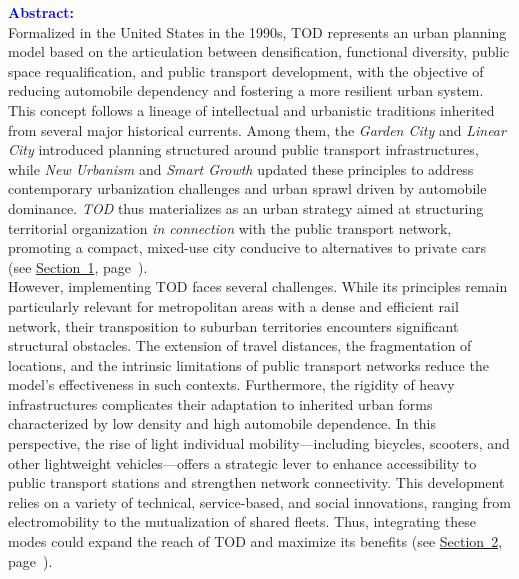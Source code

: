 \begin{refsegment}
    \newpage
    \begin{tcolorbox}[colback=white!5!white,
                      colframe=blue!75!blue,
                      title=
                      \bigskip
                      \center{\textbf{Preamble of Chapter~1}}
                      \\
                      \raggedright{\small{Chapter composed of \pagedifference{chap1:titre}{chap2:titre} pages, including \pagedifference{chap1:bibliographie}{chap2:titre} pages of bibliography}}
                      \bigskip]
\Large{\textbf{\textcolor{blue}{Abstract:}}}
    \\
    \small{
Formalized in the United States in the 1990s, \acrshort{TOD} represents an urban planning model based on the articulation between densification, functional diversity, public space requalification, and public transport development, with the objective of reducing automobile dependency and fostering a more resilient urban system. This concept follows a lineage of intellectual and urbanistic traditions inherited from several major historical currents. Among them, the \textsl{Garden City} and \textsl{Linear City} introduced planning structured around public transport infrastructures, while \textsl{New Urbanism} and \textsl{Smart Growth} updated these principles to address contemporary urbanization challenges and urban sprawl driven by automobile dominance. \textsl{TOD} thus materializes as an urban strategy aimed at structuring territorial organization \textsl{in connection} with the public transport network, promoting a compact, mixed-use city conducive to alternatives to private cars (see \hyperref[chap1:tod-presentation-generale]{Section~1}, page~\pageref{chap1:tod-presentation-generale}).%
    \\
However, implementing \acrshort{TOD} faces several challenges. While its principles remain particularly relevant for metropolitan areas with a dense and efficient rail network, their transposition to suburban territories encounters significant structural obstacles. The extension of travel distances, the fragmentation of locations, and the intrinsic limitations of public transport networks reduce the model’s effectiveness in such contexts. Furthermore, the rigidity of heavy infrastructures complicates their adaptation to inherited urban forms characterized by low density and high automobile dependence. In this perspective, the rise of light individual mobility—including bicycles, scooters, and other lightweight vehicles—offers a strategic lever to enhance accessibility to public transport stations and strengthen network connectivity. This development relies on a variety of technical, service-based, and social innovations, ranging from electromobility to the mutualization of shared fleets. Thus, integrating these modes could expand the reach of \acrshort{TOD} and maximize its benefits (see \hyperref[chap1:mobilite-individuelle-legere]{Section~2}, page~\pageref{chap1:mobilite-individuelle-legere}).%
}
\end{tcolorbox}
\end{refsegment}
